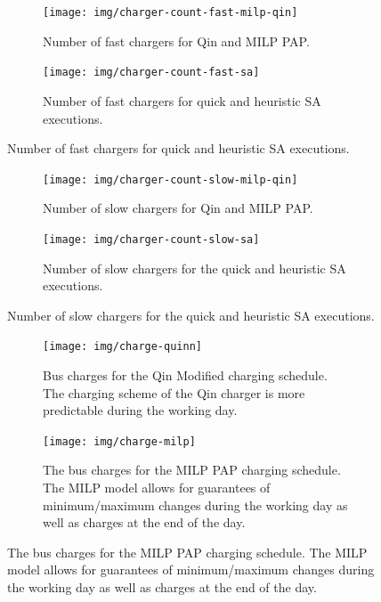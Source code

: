 \documentclass[11pt,a4paper,final]{article}
\begin{document}
\begin{figure}
    \begin{subfigure}[t]{\textwidth}
    \centering
        \texttt{[image: img/charger-count-fast-milp-qin]}
        \caption{Number of fast chargers for Qin and MILP PAP.}
        \label{subfig:fast-charger-usage-milp-qinn}
    \end{subfigure}

    \begin{subfigure}[t]{\textwidth}
    \centering
        \texttt{[image: img/charger-count-fast-sa]}
        \caption{Number of fast chargers for quick and heuristic SA executions.}
        \label{subfig:fast-charger-usage-sa}
    \end{subfigure}
\end{figure}

\begin{figure}
    \begin{subfigure}[t]{\textwidth}
    \centering
        \texttt{[image: img/charger-count-slow-milp-qin]}
        \caption{Number of slow chargers for Qin and MILP PAP.}
        \label{subfig:slow-charger-usage-milp-qinn}
    \end{subfigure}
    \begin{subfigure}[t]{\textwidth}
    \centering
        \texttt{[image: img/charger-count-slow-sa]}
        \caption{Number of slow chargers for the quick and heuristic SA executions.}
        \label{subfig:slow-charger-usage-sa}
    \end{subfigure}
\end{figure}

\begin{figure}
  \begin{subfigure}[t]{\textwidth}
    \centering
    \texttt{[image: img/charge-quinn]}
    \caption{Bus charges for the Qin Modified charging schedule. The charging scheme of the Qin charger is more predictable during the working day.}
    \label{subfig:qin-charge}
  \end{subfigure}
  \hfill
  \begin{subfigure}[t]{\textwidth}
    \centering
    \texttt{[image: img/charge-milp]}
    \caption{The bus charges for the MILP PAP charging schedule. The MILP model allows for guarantees of minimum/maximum changes during the working day as well as charges at the end of the day.}
    \label{subfig:milp-charge}
  \end{subfigure}
  \hfill
\end{figure}
\end{document}
